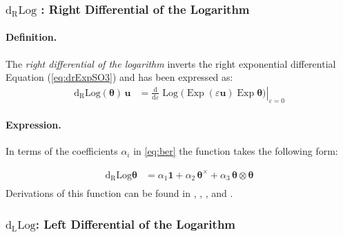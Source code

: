 \hypertarget{drLogSO3}{%
\subsubsection{\texorpdfstring{\(\operatorname{d_{\scriptscriptstyle{R}}Log}\)
: Right Differential of the Logarithm
}{drLog : Right Differential of the Logarithm }}\label{sec:drLogSO3}}

\paragraph*{Definition.}
The \emph{right differential of the logarithm} inverts the right exponential differential Equation (\ref{eq:drExpSO3}) and has been expressed as:
%
\begin{equation*} 
\begin{aligned}
\operatorname{d_{\scriptscriptstyle{R}}Log} \left({\bm{\theta}}\right) \, \bm{u}
  &= \left.\frac{\mathrm{d}}{\mathrm{d}\varepsilon} \operatorname{Log} \bigl( \operatorname{Exp} (\varepsilon \bm{u}) \operatorname{Exp} \bm{\theta}\bigr) \right|_{\varepsilon=0}
\end{aligned}
\end{equation*}

\paragraph*{Expression.}
%
In terms of the coefficients \(\alpha_i\) in \eqref{eq:ber}
the function takes the following form:

\begin{equation}
\begin{aligned}
\operatorname{d_{\scriptscriptstyle{R}}Log} {\bm{\theta}}
&=\alpha_1\mathbf{1} + \alpha_2\, \bm{\theta}^{\times} + \alpha_3\, \bm{\theta}\otimes\bm{\theta} \\
\end{aligned}
\label{eq:drLogSO3}
\end{equation}
%
Derivations of this function can be found in \cite{simo1988dynamics}, 
\cite{nour-omid1991finite}, \cite{ibrahimbegović1995computational},
and \cite{bauchau2003vectorial}.


\subsubsection{\texorpdfstring{\(\operatorname{d_{\scriptscriptstyle{L}}Log}\):
Left Differential of the
Logarithm}{dlLog: Left Differential of the Logarithm}}\label{sec:dlLog}

